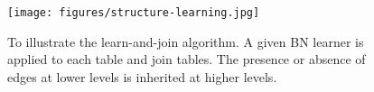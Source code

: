 \documentclass[letterpaper]{article}
\begin{document}
%
%
%  
%
%
%
%



\begin{figure}[htbp]
\begin{center}
 \texttt{[image: figures/structure-learning.jpg]} 
\caption{To illustrate the	 learn-and-join algorithm. A given BN learner is applied to each table and join tables. The presence or absence of edges at lower levels is inherited at higher levels.}
\label{fig:structure-learn}
\end{center}
\end{figure}
\end{document}
